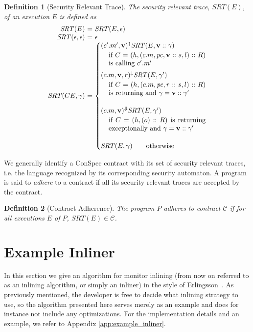 \documentclass[10pt,twocolumn]{article}
\newtheorem{definition}{Definition}
\newcommand{\PC}{\mathit{pc}}
\newcommand{\SRT}{\mathit{SRT}}
\newcommand{\Contract}{\mathcal{C}}
\begin{document}
\begin{definition}[Security Relevant Trace] The security relevant trace, 
$\SRT(E)$, of an execution $E$ is defined as
\[
\begin{array}{@{}r@{\ =\ }l@{}}
\SRT(E) & \SRT(E, \epsilon) \\
\SRT(\epsilon, \epsilon) & \epsilon \\
\SRT(CE, \gamma) & \left\{
    \begin{array}{@{}l@{}}
    (c'.m', \mathbf{v})^\uparrow \SRT(E, \mathbf{v}::\gamma) \\[1mm]
    \hspace{4mm} \parbox{5cm}{if $C = (h, (c.m,\PC,\mathbf{v}::s,l)::R)$ is calling $c'.m'$} \\[4mm]
    
    (c.m, \mathbf{v}, r)^\downarrow \SRT(E, \gamma')\\[1mm]
    \hspace{4mm} \parbox{5cm}{if $C = (h, (c.m, \PC, r::s, l)::R)$ is returning  and $\gamma = \mathbf{v}::\gamma'$}\\[7mm]
    
    (c.m, \mathbf{v})^\Downarrow\SRT(E, \gamma') \\[1mm]
    \hspace{4mm} \parbox{5cm}{if $C = (h, (o)::R)$ is returning exceptionally and $\gamma = \mathbf{v}::\gamma'$}\\[7mm]
    
    \SRT(E, \gamma) \qquad \mbox{otherwise}
\end{array}\right.\end{array}\]
\end{definition}

We generally identify a ConSpec contract with its set of security relevant
traces, i.e. the language recognized by its corresponding security automaton.
A program is said to \emph{adhere} to a contract if all its security 
relevant traces are accepted by the contract.
\begin{definition}[Contract Adherence]
The program $P$ adheres to contract $\Contract$ if for all 
executions $E$ of $P$, $\SRT(E)\in\Contract$.
\end{definition}

\section{Example Inliner}\label{sect:inlining}
In this section we give an algorithm for monitor inlining (from now on referred to as an inlining algorithm, or simply an inliner) in the style of Erlingsson~\cite{ErlSch00}. As previously mentioned, the developer is free to decide what inlining strategy to use, so the algorithm presented here serves merely as an example and does for instance not include any optimizations. For the implementation details and an example, we refer to Appendix \ref{app:example_inliner}.
\end{document}
